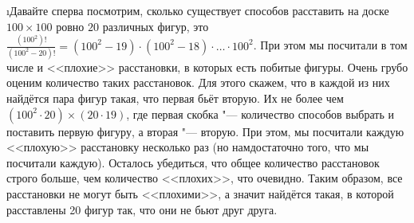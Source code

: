 \i Давайте сперва посмотрим, сколько существует способов расставить на доске $100 \times 100$ ровно $20$ различных фигур, это $\frac{(100^2)!}{(100^2-20)!} = (100^2-19) \cdot (100^2-18) \cdot \ldots \cdot 100^2$. При этом мы посчитали в том числе и <<плохие>> расстановки, в которых есть побитые фигуры. Очень грубо оценим количество таких расстановок. Для этого скажем, что в каждой из них найдётся пара фигур такая, что первая бьёт вторую. Их не более чем $(100^2 \cdot 20) \times (20 \cdot 19)$, где первая скобка "--- количество способов выбрать и поставить первую фигуру, а вторая "--- вторую. При этом, мы посчитали каждую <<плохую>> расстановку несколько раз (но намдостаточно того, что мы посчитали каждую). Осталось убедиться, что общее количество расстановок строго больше, чем количество <<плохих>>, что очевидно. Таким образом, все расстановки не могут быть <<плохими>>, а значит найдётся такая, в которой расставлены 20 фигур так, что они не бьют друг друга.